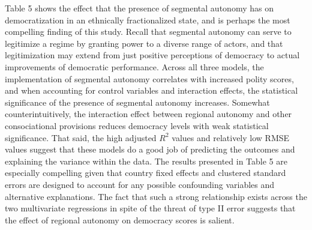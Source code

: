 \documentclass[12pt]{article}
\begin{document}
Table 5 shows the effect that the presence of segmental autonomy has on democratization in an ethnically fractionalized state, and is perhaps the most compelling finding of this study. Recall that segmental autonomy can serve to legitimize a regime by granting power to a diverse range of actors, and that legitimization may extend from just positive perceptions of democracy to actual improvements of democratic performance. Across all three models, the implementation of segmental autonomy correlates with increased polity scores, and when accounting for control variables and interaction effects, the statistical significance of the presence of segmental autonomy increases. Somewhat counterintuitively, the interaction effect between regional autonomy and other consociational provisions reduces democracy levels with weak statistical significance. That said, the high adjusted $R^2$ values and relatively low RMSE values suggest that these models do a good job of predicting the outcomes and explaining the variance within the data. The results presented in Table 5 are especially compelling given that country fixed effects and clustered standard errors are designed to account for any possible confounding variables and alternative explanations. The fact that such a strong relationship exists across the two multivariate regressions in spite of the threat of type II error suggests that the effect of regional autonomy on democracy scores is salient.  
\end{document}
